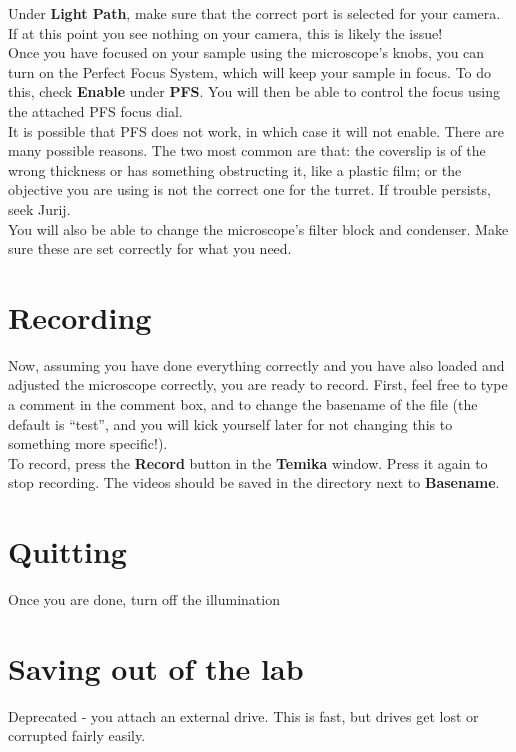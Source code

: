 \documentclass{report}
\begin{document}
Under \textbf{Light Path}, make sure that the correct port is selected for your camera. If at this point you see nothing on your camera, this is likely the issue!\\

Once you have focused on your sample using the microscope's knobs, you can turn on the Perfect Focus System, which will keep your sample in focus. To do this, check \textbf{Enable} under \textbf{PFS}. You will then be able to control the focus using the attached PFS focus dial.\\

It is possible that PFS does not work, in which case it will not enable. There are many possible reasons. The two most common are that: the coverslip is of the wrong thickness or has something obstructing it, like a plastic film; or  the objective you are using is not the correct one for the turret. If trouble persists, seek Jurij.\\

You will also be able to change the microscope's filter block and condenser. Make sure these are set correctly for what you need.\\



\newpage

\section{Recording}

Now, assuming you have done everything correctly and you have also loaded and adjusted the microscope correctly, you are ready to record. First, feel free to type a comment in the comment box, and to change the basename of the file (the default is ``test'', and you will kick yourself later for not changing this to something more specific!).\\

To record, press the \textbf{Record} button in the \textbf{Temika} window. Press it again to stop recording. The videos should be saved in the directory next to \textbf{Basename}.



\newpage

\section{Quitting}

Once you are done, turn off the illumination


\section{Saving out of the lab}
Deprecated - you attach an external drive. This is fast, but drives get lost or corrupted fairly easily.\\
\end{document}
